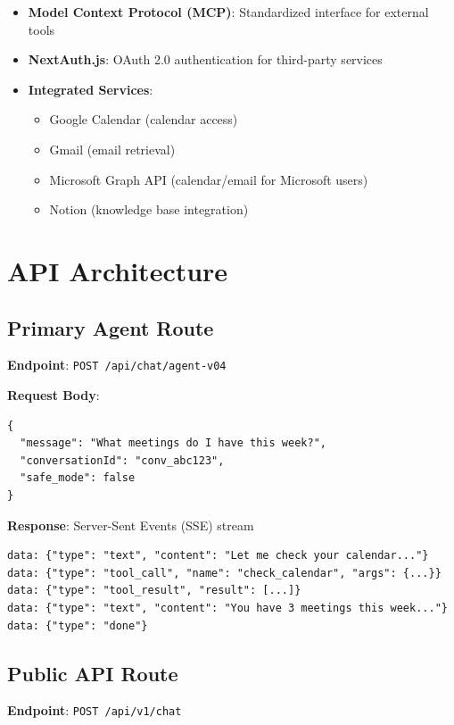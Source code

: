 \begin{itemize}
    \item \textbf{Model Context Protocol (MCP)}: Standardized interface for external tools
    \item \textbf{NextAuth.js}: OAuth 2.0 authentication for third-party services
    \item \textbf{Integrated Services}:
    \begin{itemize}
        \item Google Calendar (calendar access)
        \item Gmail (email retrieval)
        \item Microsoft Graph API (calendar/email for Microsoft users)
        \item Notion (knowledge base integration)
    \end{itemize}
\end{itemize}

\section{API Architecture}

\subsection{Primary Agent Route}

\textbf{Endpoint}: \texttt{POST /api/chat/agent-v04}

\textbf{Request Body}:
\begin{verbatim}
{
  "message": "What meetings do I have this week?",
  "conversationId": "conv_abc123",
  "safe_mode": false
}
\end{verbatim}

\textbf{Response}: Server-Sent Events (SSE) stream
\begin{verbatim}
data: {"type": "text", "content": "Let me check your calendar..."}
data: {"type": "tool_call", "name": "check_calendar", "args": {...}}
data: {"type": "tool_result", "result": [...]}
data: {"type": "text", "content": "You have 3 meetings this week..."}
data: {"type": "done"}
\end{verbatim}

\subsection{Public API Route}

\textbf{Endpoint}: \texttt{POST /api/v1/chat}

